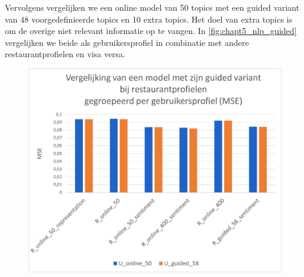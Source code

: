Vervolgens vergelijken we een online model van 50 topics met een guided variant van 48 voorgedefinieerde topics en 10 extra topics. Het doel van extra topics is om de overige niet relevant informatie op te vangen. In \autoref{fig:chapt5_nlp_guided} vergelijken we beide als gebruikersprofiel in combinatie met andere restaurantprofielen en visa versa. \\

\begin{figure}[H]

        \centering
        \parbox[b]{0.6\textwidth}{\includegraphics[width=\linewidth]{fig/chapt5/NLP/nlp_comparison_guided_gebruiker.png}}\quad
        \parbox[b]{0.37\textwidth}{
        \label{fig:chapt5_nlp_guided_user}}
        \\[.5cm]


\end{figure}
